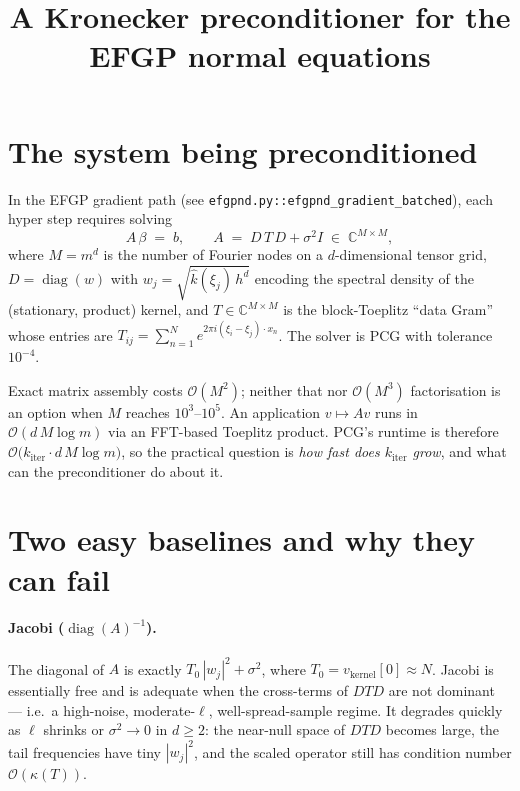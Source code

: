 \documentclass[11pt]{article}
\title{A Kronecker preconditioner for the EFGP normal equations}
\author{}
\date{}
\newcommand{\bigo}{\mathcal{O}}
\newcommand{\diag}{\operatorname{diag}}
\begin{document}
\maketitle

\section{The system being preconditioned}

In the EFGP gradient path (see \texttt{efgpnd.py::efgpnd\_gradient\_batched}), each
hyper step requires solving
\begin{equation}
  A\,\beta \;=\; b, \qquad
  A \;=\; D\,T\,D + \sigma^2 I \;\in\; \mathbb{C}^{M\times M},
  \label{eq:A}
\end{equation}
where $M = m^d$ is the number of Fourier nodes on a $d$-dimensional tensor
grid, $D = \diag(w)$ with $w_j = \sqrt{\hat k(\xi_j)\,h^d}$ encoding the
spectral density of the (stationary, product) kernel, and
$T \in \mathbb{C}^{M\times M}$ is the block-Toeplitz ``data Gram'' whose
entries are $T_{ij} = \sum_{n=1}^N e^{2\pi i (\xi_i-\xi_j)\cdot x_n}$. The
solver is PCG with tolerance $10^{-4}$.

Exact matrix assembly costs $\bigo(M^2)$; neither that nor $\bigo(M^3)$
factorisation is an option when $M$ reaches $10^3$–$10^5$. An
application $v \mapsto Av$ runs in $\bigo(d\, M\log m)$ via an FFT-based
Toeplitz product. PCG's runtime is therefore
$\bigo\bigl(k_{\mathrm{iter}} \cdot d\, M\log m\bigr)$, so the practical
question is \emph{how fast does $k_{\mathrm{iter}}$ grow}, and what can
the preconditioner do about it.

\section{Two easy baselines and why they can fail}

\paragraph{Jacobi ($\diag(A)^{-1}$).}
The diagonal of $A$ is exactly $T_{0}\,|w_j|^2 + \sigma^2$, where
$T_0 = v_{\mathrm{kernel}}[0] \approx N$. Jacobi is essentially free and
is adequate when the cross-terms of $D T D$ are not dominant --- i.e.\ a
high-noise, moderate-$\ell$, well-spread-sample regime. It degrades
quickly as $\ell$ shrinks or $\sigma^2 \to 0$ in $d \geq 2$: the near-null
space of $D T D$ becomes large, the tail frequencies have tiny
$|w_j|^2$, and the scaled operator still has condition number
$\bigo(\kappa(T))$.
\end{document}
